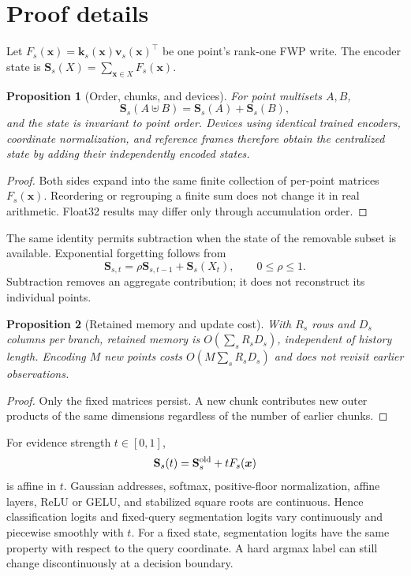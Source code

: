\documentclass[review,12pt,authoryear]{elsarticle}
\newtheorem{proposition}{Proposition}
\newcommand{\Sstate}{\mathbf{S}}
\begin{document}
\section{Proof details}

Let \(F_s(\bm x)=\bm k_s(\bm x)\bm v_s(\bm x)^\top\) be one point's rank-one FWP write. The encoder state is \(\Sstate_s(X)=\sum_{\bm x\in X}F_s(\bm x)\).

\begin{proposition}[Order, chunks, and devices]
For point multisets \(A,B\),
\[
\Sstate_s(A\uplus B)=\Sstate_s(A)+\Sstate_s(B),
\]
and the state is invariant to point order. Devices using identical trained encoders, coordinate normalization, and reference frames therefore obtain the centralized state by adding their independently encoded states.
\end{proposition}
\begin{proof}
Both sides expand into the same finite collection of per-point matrices \(F_s(\bm x)\). Reordering or regrouping a finite sum does not change it in real arithmetic. Float32 results may differ only through accumulation order.
\end{proof}

The same identity permits subtraction when the state of the removable subset is available. Exponential forgetting follows from
\[
\Sstate_{s,t}=\rho\Sstate_{s,t-1}+\Sstate_s(X_t),\qquad 0\leq\rho\leq1.
\]
Subtraction removes an aggregate contribution; it does not reconstruct its individual points.

\begin{proposition}[Retained memory and update cost]
With \(R_s\) rows and \(D_s\) columns per branch, retained memory is \(O(\sum_sR_sD_s)\), independent of history length. Encoding \(M\) new points costs \(O(M\sum_sR_sD_s)\) and does not revisit earlier observations.
\end{proposition}
\begin{proof}
Only the fixed matrices persist. A new chunk contributes new outer products of the same dimensions regardless of the number of earlier chunks.
\end{proof}

For evidence strength \(t\in[0,1]\),
\[
\Sstate_s(t)=\Sstate_s^{\rm old}+tF_s(\bm x)
\]
is affine in \(t\). Gaussian addresses, softmax, positive-floor normalization, affine layers, ReLU or GELU, and stabilized square roots are continuous. Hence classification logits and fixed-query segmentation logits vary continuously and piecewise smoothly with \(t\). For a fixed state, segmentation logits have the same property with respect to the query coordinate. A hard argmax label can still change discontinuously at a decision boundary.
\end{document}
